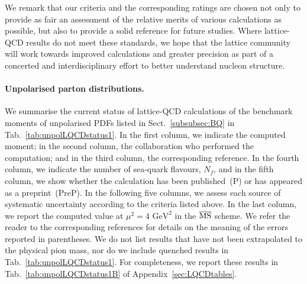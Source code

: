 We remark that our criteria and the corresponding ratings are chosen 
not only to provide as fair an assessment of the relative merits of various 
calculations as possible, but also to provide a solid reference for future studies.
%
Where lattice-QCD results do not meet these standards, we hope that the lattice 
community will work towards improved calculations and greater precision as 
part of a concerted and interdisciplinary effort to better understand
nucleon structure.

\paragraph{Unpolarised parton distributions.}
We summarise the current status of lattice-QCD calculations of the benchmark 
moments of unpolarised PDFs listed in Sect.~\ref{subsubsec:BQ} in 
Tab.~\ref{tab:unpolLQCDstatus1}. 
%
In the first column, we indicate the computed moment; in the second column,
the collaboration who performed the computation; and in the third column,
the corresponding reference.
%
In the fourth column, we indicate the number of sea-quark flavours, $N_f$, 
and in the fifth column, we show whether the calculation has been published~(P) 
or has appeared as a preprint~(PreP).
%
In the following five columns, we assess each source of systematic uncertainty
according to the criteria listed above. 
%
In the last column, we report the computed value at $\mu^2=4\mbox{ GeV}^2$
 in the $\overline{{\rm MS}}$ scheme.
%
We refer the reader to the corresponding references for details on the 
meaning of the errors reported in parentheses.
%
We do not list results that have not been extrapolated to the physical pion 
mass, nor do we include quenched results in Tab.~\ref{tab:unpolLQCDstatus1}. 
%
For completeness, we report these results in Tab.~\ref{tab:unpolLQCDstatus1B} 
of Appendix~\ref{sec:LQCDtables}.

